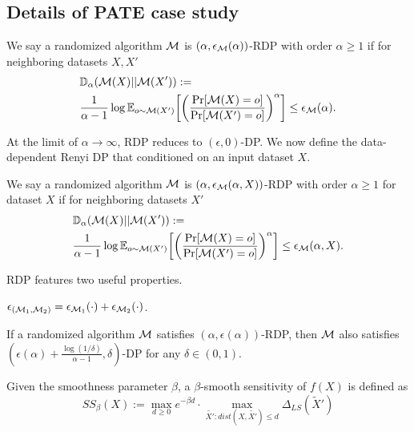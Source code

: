 \subsection{Details of PATE case study}

\begin{definition}
    We say a randomized algorithm $\mathcal{M}$ is $(\alpha, \epsilon_{\mathcal{M}}(\alpha))$-RDP with order $\alpha \geq 1$ if for neighboring datasets $X, X'$
    \begin{align*}
    &\mathbb{D}_{\alpha}(\mathcal{M}(X)||   \mathcal{M}(X')):=\\
    & \frac{1}{\alpha-1}\log \mathbb{E}_{o \sim \mathcal{M}(X')}\bigg[ \bigg( \frac{\mathrm{Pr}[\mathcal{M}(X)=o]}{\mathrm{Pr}[\mathcal{M}(X')=o]}\bigg)^\alpha \bigg]\leq \epsilon_{\mathcal{M}}(\alpha).
    \end{align*}
\end{definition}
At the limit of $\alpha \to \infty$, RDP reduces to $(\epsilon, 0)$-DP. 
We now define the  data-dependent Renyi DP that conditioned on an input dataset $X$.
\begin{definition}
    We say a randomized algorithm $\mathcal{M}$ is $(\alpha, \epsilon_{\mathcal{M}}(\alpha, X))$-RDP with order $\alpha \geq 1$ for dataset $X$ if for neighboring datasets $X'$
    \begin{align*}
    &\mathbb{D}_{\alpha}(\mathcal{M}(X)||   \mathcal{M}(X')):=\\
    & \frac{1}{\alpha-1}\log \mathbb{E}_{o \sim \mathcal{M}(X')}\bigg[ \bigg( \frac{\mathrm{Pr}[\mathcal{M}(X)=o]}{\mathrm{Pr}[\mathcal{M}(X')=o]}\bigg)^\alpha \bigg]\leq \epsilon_{\mathcal{M}}(\alpha, X).
    \end{align*}
\end{definition}


RDP features two useful properties.
\begin{lemma}
    $\epsilon_{(\mathcal{M}_1, \mathcal{M}_2)} = \epsilon_{\mathcal{M}_1}(\cdot) + \epsilon_{\mathcal{M}_2}(\cdot)$.
\end{lemma}
\begin{lemma} If a randomized algorithm $\mathcal{M}$ satisfies $(\alpha,\epsilon(\alpha))$-RDP, then $\mathcal{M}$ also satisfies $(\epsilon(\alpha)+\frac{\log(1/\delta)}{\alpha-1},\delta)$-DP for any $\delta \in (0,1)$. \label{lem: rdp2dp}
\end{lemma}


\begin{definition}\label{def: smooth}
	Given the smoothness parameter $\beta$, a $\beta$-smooth sensitivity of $f(X)$ is defined as 
	\[SS_\beta(X):= \max_{d\geq 0} e^{-\beta d} \cdot \max_{\tilde{X'}: dist(X, \tilde{X'})\leq d} \Delta_{LS}(\tilde{X}')\]
\end{definition}


